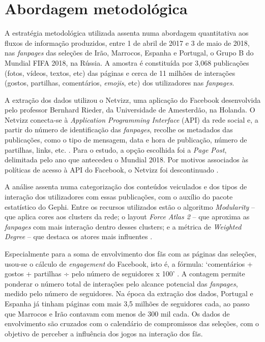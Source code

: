 \documentclass{textolivre}
\begin{document}
\section{Abordagem metodológica}\label{sec-abordagem}
A estratégia metodológica utilizada assenta numa abordagem quantitativa aos fluxos de informação produzidos, entre 1 de abril de 2017 e 3 de maio de 2018, nas \emph{fanpages} das seleções de Irão, Marrocos, Espanha e Portugal, o Grupo B do Mundial FIFA 2018, na Rússia. A amostra é constituída por 3,068 publicações (fotos, vídeos, textos, etc) das páginas e cerca de 11 milhões de interações (gostos, partilhas, comentários, \emph{emojis}, etc) dos utilizadores nas \emph{fanpages}.

A extração dos dados utilizou o Netvizz, uma aplicação do Facebook desenvolvida pelo professor Bernhard Rieder, da Universidade de Amesterdão, na Holanda. O Netvizz conecta-se à \emph{Application Programming Interface} (API) da rede social e, a partir do número de identificação das \emph{fanpages}, recolhe os metadados das publicações, como o tipo de mensagem, data e hora de publicação, número de partilhas, links, etc. \cite{rieder2013}. Para o estudo, a opção escolhida foi a \emph{Page Post}, delimitada pelo ano que antecedeu o Mundial 2018. Por motivos associados às políticas de acesso à API do Facebook, o Netvizz foi descontinuado \cite{rieder2019}.

A análise assenta numa categorização dos conteúdos veiculados e dos tipos de interação dos utilizadores com essas publicações, com o auxílio do pacote estatístico do Gephi. Entre os recursos utilizados estão o algoritmo \emph{Modularity} – que aplica cores aos clusters da rede; o layout \emph{Force Atlas 2} – que aproxima as \emph{fanpages} com mais interação dentro desses clusters; e a métrica de \emph{Weighted Degree} – que destaca os atores mais influentes \cite{barabasi2016}.

Especialmente para a soma de envolvimento dos fãs com as páginas das seleções, usou-se o cálculo de \emph{engagement} do Facebook, isto é, a fórmula: ‘comentários + gostos + partilhas ÷ pelo número de seguidores x 100’ \cite{vadivu2015}. A contagem permite ponderar o número total de interações pelo alcance potencial das \emph{fanpages}, medido pelo número de seguidores. Na época da extração dos dados, Portugal e Espanha já tinham páginas com mais 3,5 milhões de seguidores cada, ao passo que Marrocos e Irão contavam com menos de 300 mil cada. Os dados de envolvimento são cruzados com o calendário de compromissos das seleções, com o objetivo de perceber a influência dos jogos na interação dos fãs.
\end{document}

